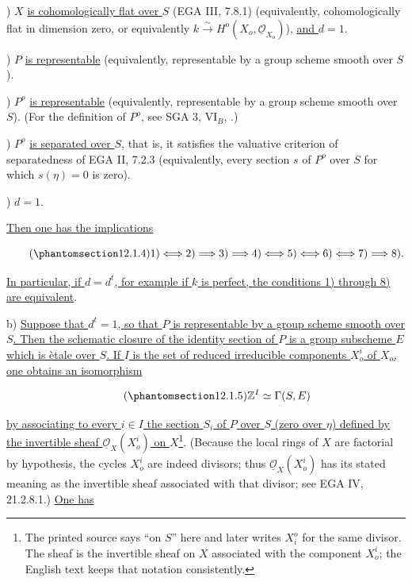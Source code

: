 \smallskip
{}) $X$ \underline{is cohomologically flat over $S$} (EGA III, 7.8.1)
(equivalently, cohomologically flat in dimension zero, or equivalently
$k\xrightarrow{\sim}H^o(X_o,\underline{\mathcal O}_{X_o})$),
\underline{and $d=1$}.

\smallskip
{}) $P$ \underline{is representable} (equivalently, representable by a
group scheme smooth over $S$).

\smallskip
{}) $P^o$ \underline{is representable} (equivalently, representable by a
group scheme smooth over $S$). (For the definition of $P^o$, see SGA 3,
$\mathrm{VI}_B$, .)

\smallskip
{}) $P^o$ \underline{is separated over $S$}, that is, it satisfies the
valuative criterion of separatedness of EGA II, 7.2.3 (equivalently,
every section $s$ of $P^o$ over $S$ for which $s(\eta)=0$ is zero).

\smallskip
{}) $d=1$.

\smallskip
\noindent
\underline{Then one has the implications}

\begin{equation}\tag{\SGARefTarget{sga7.sga7i.eix.n12-1-4}{12.1.4}}
 1)\Longleftrightarrow2)\Longrightarrow3)\Longrightarrow4)
 \Longleftrightarrow5)\Longleftrightarrow6)\Longleftrightarrow7)
 \Longrightarrow8).
\end{equation}

\noindent
\underline{In particular, if $d=d^t$, for example if $k$ is perfect, the
conditions 1) through 8) are equivalent}.

\medskip
\noindent
b) \underline{Suppose that $d^t=1$, so that $P$ is representable by a
group scheme smooth over $S$. Then the schematic closure of the identity
section of $P$ is a group subscheme $E$ which is \`etale over $S$. If $I$
is the set of reduced irreducible components $X_o^i$ of $X_o$, one obtains
an isomorphism}

\begin{equation}\tag{\SGARefTarget{sga7.sga7i.eix.n12-1-5}{12.1.5}}
 \mathbb Z^I\simeq\Gamma(S,E)
\end{equation}

\noindent
\underline{by associating to every $i\in I$ the section $S_i$ of $P$ over
$S$ (zero over $\eta$) defined by the invertible sheaf
$\underline{\mathcal O}_X(X_o^i)$ on $X$}\footnote{The printed source says
``on $S$'' here and later writes $X_i^o$ for the same divisor. The sheaf is
the invertible sheaf on $X$ associated with the component $X_o^i$; the
English text keeps that notation consistently.}. (Because the local rings of $X$
are factorial by hypothesis, the cycles $X_o^i$ are indeed divisors; thus
$\underline{\mathcal O}_X(X_o^i)$ has its stated meaning as the invertible
sheaf associated with that divisor; see EGA IV, 21.2.8.1.) \underline{One
has}

